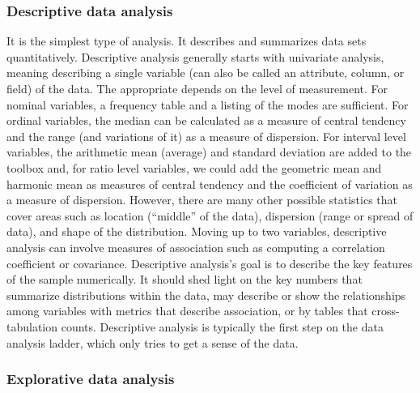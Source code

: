 \documentclass[
]{book}
\begin{document}
\hypertarget{descriptive-data-analysis}{%
\subsubsection*{\texorpdfstring{\textbf{Descriptive data analysis}}{Descriptive data analysis}}\label{descriptive-data-analysis}}


It is the simplest type of analysis. It describes and summarizes data sets quantitatively. Descriptive analysis generally starts with univariate analysis, meaning describing a single variable (can also be called an attribute, column, or field) of the data. The appropriate depends on the level of measurement. For nominal variables, a frequency table and a listing of the modes are sufficient. For ordinal variables, the median can be calculated as a measure of central tendency and the range (and variations of it) as a measure of dispersion. For interval level variables, the arithmetic mean (average) and standard deviation are added to the toolbox and, for ratio level variables, we could add the geometric mean and harmonic mean as measures of central tendency and the coefficient of variation as a measure of dispersion. However, there are many other possible statistics that cover areas such as location (``middle'' of the data), dispersion (range or spread of data), and shape of the distribution. Moving up to two variables, descriptive analysis can involve measures of association such as computing a correlation coefficient or covariance. Descriptive analysis's goal is to describe the key features of the sample numerically. It should shed light on the key numbers that summarize distributions within the data, may describe or show the relationships among variables with metrics that describe association, or by tables that cross-tabulation counts. Descriptive analysis is typically the first step on the data analysis ladder, which only tries to get a sense of the data.

\hypertarget{explorative-data-analysis}{%
\subsubsection*{\texorpdfstring{\textbf{Explorative data analysis}}{Explorative data analysis}}\label{explorative-data-analysis}}
\end{document}
